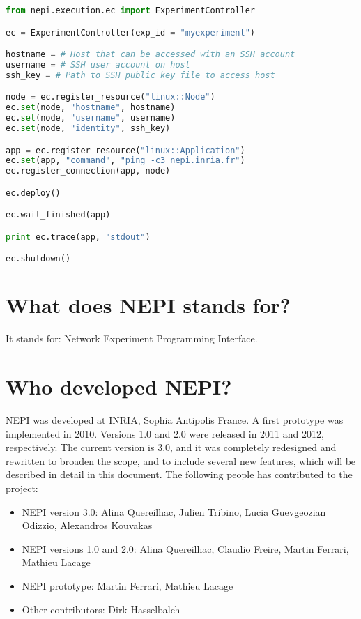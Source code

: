 \begin{lstlisting}[language=Python]
from nepi.execution.ec import ExperimentController

ec = ExperimentController(exp_id = "myexperiment")

hostname = # Host that can be accessed with an SSH account
username = # SSH user account on host
ssh_key = # Path to SSH public key file to access host

node = ec.register_resource("linux::Node")
ec.set(node, "hostname", hostname)
ec.set(node, "username", username)
ec.set(node, "identity", ssh_key)

app = ec.register_resource("linux::Application")
ec.set(app, "command", "ping -c3 nepi.inria.fr")
ec.register_connection(app, node)

ec.deploy()

ec.wait_finished(app)

print ec.trace(app, "stdout")

ec.shutdown()

\end{lstlisting}

\section{What does NEPI stands for?}

It stands for: Network Experiment Programming Interface.

\section{Who developed NEPI?}

NEPI was developed at INRIA, Sophia Antipolis France.
A first prototype was implemented in 2010. 
Versions 1.0 and 2.0 were released in 2011 and 2012, respectively. 
The current version is 3.0, and it was completely redesigned and
rewritten to broaden the scope, and to include several  
new features, which will be described in detail in this document.
The following people has contributed to the project:

\begin{itemize}
  \item NEPI version 3.0: Alina Quereilhac, Julien Tribino, Lucia Guevgeozian Odizzio, Alexandros Kouvakas
  \item NEPI versions 1.0 and 2.0: Alina Quereilhac, Claudio Freire, Martin Ferrari, Mathieu Lacage
  \item NEPI prototype: Martin Ferrari, Mathieu Lacage
  \item Other contributors: Dirk Hasselbalch
\end{itemize}

